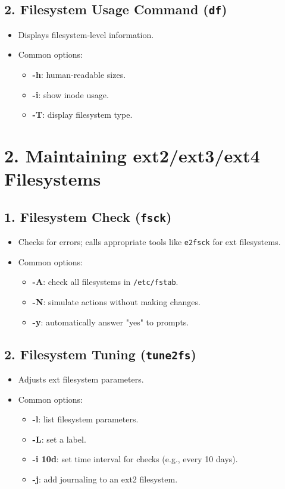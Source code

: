 \documentclass[a4paper]{report}
\begin{document}
\subsection*{2. Filesystem Usage Command (\texttt{df})}
\begin{itemize}
    \item Displays filesystem-level information.
    \item Common options:
    \begin{itemize}
        \item \textbf{-h}: human-readable sizes.
        \item \textbf{-i}: show inode usage.
        \item \textbf{-T}: display filesystem type.
    \end{itemize}
\end{itemize}

\section*{2. Maintaining ext2/ext3/ext4 Filesystems}

\subsection*{1. Filesystem Check (\texttt{fsck})}
\begin{itemize}
    \item Checks for errors; calls appropriate tools like \texttt{e2fsck} for ext filesystems.
    \item Common options:
    \begin{itemize}
        \item \textbf{-A}: check all filesystems in \texttt{/etc/fstab}.
        \item \textbf{-N}: simulate actions without making changes.
        \item \textbf{-y}: automatically answer "yes" to prompts.
    \end{itemize}
\end{itemize}

\subsection*{2. Filesystem Tuning (\texttt{tune2fs})}
\begin{itemize}
    \item Adjusts ext filesystem parameters.
    \item Common options:
    \begin{itemize}
        \item \textbf{-l}: list filesystem parameters.
        \item \textbf{-L}: set a label.
        \item \textbf{-i 10d}: set time interval for checks (e.g., every 10 days).
        \item \textbf{-j}: add journaling to an ext2 filesystem.
    \end{itemize}
\end{itemize}
\end{document}
